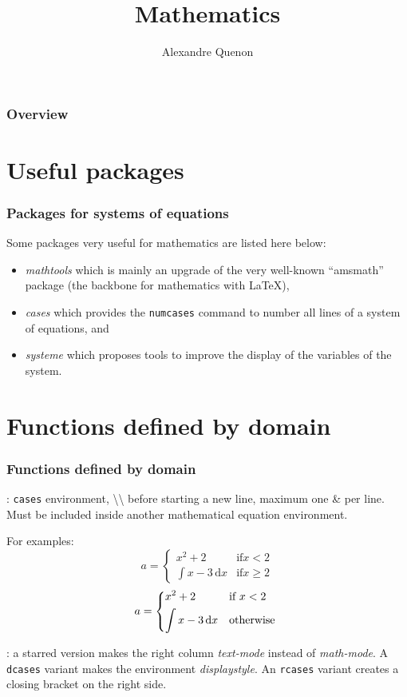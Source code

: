 \documentclass[11pt]{beamer}
\title{Mathematics}
\author[A. Quenon]{Alexandre Quenon}
\begin{document}
\begin{frame}
	\titlepage
\end{frame}


\begin{frame}
	\frametitle{Overview}
	
	\tableofcontents
\end{frame}


\section{Useful packages}

\begin{frame}
	\frametitle{Packages for systems of equations}

	Some packages very useful for mathematics are listed here below:
	\begin{itemize}
		\item \emph{mathtools} which is mainly an upgrade of the very well-known \enquote{amsmath} package (the backbone for mathematics with \LaTeX{}),
		\item \emph{cases} which provides the \texttt{numcases} command to number all lines of a system of equations, and
		\item \emph{systeme} which proposes tools to improve the display of the variables of the system.
	\end{itemize}
\end{frame}


\section{Functions defined by domain}

\begin{frame}
	\frametitle{Functions defined by domain}
	
	: \texttt{cases} environment, \textbackslash\textbackslash{} before starting a new line, maximum one \& per line.
	Must be included inside another mathematical equation environment.
	
	For examples:
	\begin{equation}
		a = \begin{cases}
			x^2 + 2					& \text{if} x<2  \\
			\int x-3\, \mathrm{d}x	& \text{if} x \geq 2
		\end{cases}
	\end{equation}
	\begin{equation}
		a = \begin{dcases*}
			x^2 + 2					& if  $x<2$  \\
			\int x-3\, \mathrm{d}x	& otherwise
		\end{dcases*}
	\end{equation}
	
	
	: a starred version makes the right column \emph{text-mode} instead of \emph{math-mode}.
	A \texttt{dcases} variant makes the environment \emph{displaystyle}.
	An \texttt{rcases} variant creates a closing bracket on the right side.
\end{frame}
\end{document}
